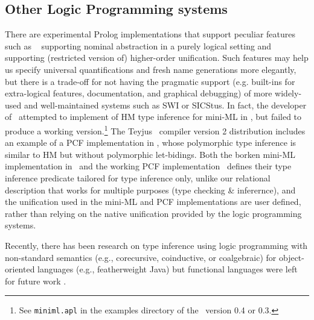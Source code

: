 \subsection{Other Logic Programming systems}
There are experimental Prolog implementations that support peculiar features
such as \aProlog\ \cite{cheney04iclp} supporting nominal abstraction in a purely
logical setting and \lProlog\ \cite{nadathur99cade} supporting (restricted
version of) higher-order unification. Such features may help us specify universal
quantifications and fresh name generations more elegantly, but there is a
trade-off for not having the pragmatic support (e.g. built-ins for extra-logical
features, documentation, and graphical debugging) of more widely-used and
well-maintained systems such as SWI or SICStus. In fact, the developer of
\aProlog\ attempted to implement of HM type inference for mini-ML in \aProlog,
but failed to produce a working version.\footnote{See \texttt{miniml.apl}
	in the examples directory of the \aProlog\ version 0.4 or 0.3.}
The Teyjus \lProlog\ compiler version 2 distribution includes an example of
a PCF implementation in \lProlog, whose polymorphic type inference is similar
to HM but without polymorphic let-bidings. Both the borken mini-ML implementation
in \aProlog\ and the working PCF implementation \lProlog\ defines their
type inference predicate tailored for type inference only, unlike our relational
description that works for multiple purposes (type checking \& inferernce),
and the unification used in the mini-ML and PCF implementations are user defined,
rather than relying on the native unification provided by the logic programming
systems.

Recently, there has been research on type inference using logic programming
with non-standard semantics (e.g., corecursive, coinductive, or coalgebraic)
for object-oriented languages (e.g., featherweight Java) but
functional languages were left for future work \cite{AL-ECOOP09}.

